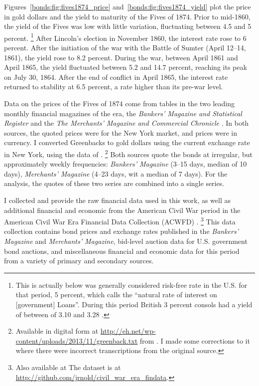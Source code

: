 Figures~\ref{bonds:fig:fives1874_price} and~\ref{bonds:fig:fives1874_yield} plot the price in gold dollars and the yield to maturity of the Fives of 1874.
Prior to mid-1860, the yield of the Fives was low with little variation, fluctuating between 4.5 and 5 percent.%
\footnote{
  This is actually below was generally considered risk-free rate in the U.S. for that period, 5 percent, which \textcite[29]{Elder1863} calls the ``natural rate of interest on [government] Loans''.
  During this period British 3 percent consols had a yield of between of 3.10 and 3.28 \parencite[193]{HomerSylla2005}.
}
After Lincoln's election in November 1860,  the interest rate rose to 6 percent.
After the initiation of the war with the Battle of Sumter (April 12--14, 1861), the yield rose to 8.2 percent.
During the war, between April 1861 and April 1865, the yield fluctuated between 5.2 and 14.7 percent, reaching its peak on July 30, 1864.
After the end of conflict in April 1865, the interest rate returned to stability at 6.5 percent, a rate higher than its pre-war level.

Data on the prices of the Fives of 1874 come from tables in the two leading monthly financial magazines of the era, the \textit{Bankers' Magazine and Statistical Register} and the \textit{The Merchants' Magazine and Commercial Chronicle} \parencites[186]{Mitchell1903}.
In both sources, the quoted prices were for the New York market, and prices were in currency.
I converted Greenbacks to gold dollars using the current exchange rate in New York, using the data of \textcite{Mitchell1908}.%
\footnote{
  Available in digital form at \url{http://eh.net/wp-content/uploads/2013/11/greenback.txt} from \textcite{WillardGuinnaneEtAl1996}.
  I made some corrections to it where there were incorrect transcriptions from the original source.
}
Both sources quote the bonds at irregular, but approximately weekly frequencies: \textit{Bankers' Magazine} (3--15 days, median of 10 days), \textit{Merchants' Magazine} (4--23 days, wit a median of 7 days).
For the analysis, the quotes of these two series are combined into a single series.

I collected and provide the raw financial data used in this work, as well as additional financial and economic from the American Civil War period in the American Civil War Era Financial Data Collection (ACWFD) \parencite{Arnold2015a}.%
\footnote{Also available at The dataset is at \url{http://github.com/jrnold/civil_war_era_findata}.}
This data collection contains bond prices and exchange rates published in the \textit{Bankers' Magazine} and \textit{Merchants' Magazine}, bid-level auction data for U.S. government bond auctions, and miscellaneous financial and economic data for this period from a variety of primary and secondary sources.

